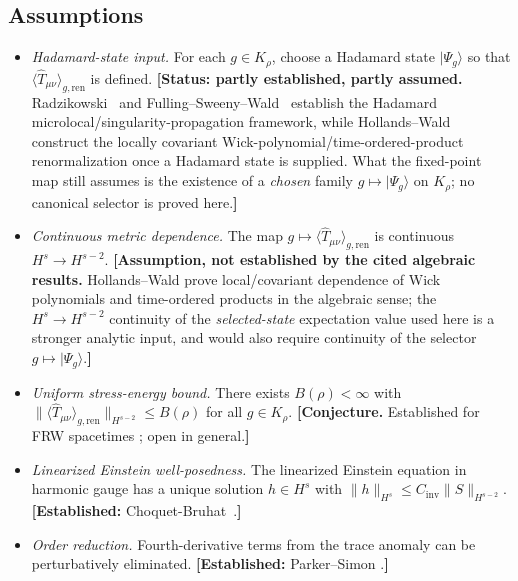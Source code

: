 \documentclass[12pt,a4paper]{article}
\begin{document}
\subsection{Assumptions}

\begin{itemize}
\item[\textbf{(A1)}] \textit{Hadamard-state input.} For each $g\in K_\rho$, choose a
Hadamard state $|\Psi_g\rangle$ so that $\langle\hat{T}_{\mu\nu}\rangle_{g,\text{ren}}$ is
defined. \textbf{[Status: partly established, partly assumed.} Radzikowski~\cite{radzikowski}
and Fulling--Sweeny--Wald~\cite{fulling_sweeny_wald} establish the Hadamard
microlocal/singularity-propagation framework, while Hollands--Wald~\cite{hollands_wald_wick}
construct the locally covariant Wick-polynomial/time-ordered-product renormalization once a
Hadamard state is supplied. What the fixed-point map still assumes is the existence of a
\emph{chosen} family $g\mapsto |\Psi_g\rangle$ on $K_\rho$; no canonical selector is proved
here.\textbf{]}

\item[\textbf{(A2)}] \textit{Continuous metric dependence.} The map $g\mapsto
\langle\hat{T}_{\mu\nu}\rangle_{g,\text{ren}}$ is continuous $H^s\to H^{s-2}$.
\textbf{[Assumption, not established by the cited algebraic results.} Hollands--Wald
\cite{hollands_wald_wick} prove local/covariant dependence of Wick polynomials and
time-ordered products in the algebraic sense; the $H^s\to H^{s-2}$ continuity of the
\emph{selected-state} expectation value used here is a stronger analytic input, and would
also require continuity of the selector $g\mapsto |\Psi_g\rangle$.\textbf{]}

\item[\textbf{(A3)}] \textit{Uniform stress-energy bound.} There exists $B(\rho)<\infty$
with $\|\langle\hat{T}_{\mu\nu}\rangle_{g,\text{ren}}\|_{H^{s-2}} \leq B(\rho)$ for all
$g\in K_\rho$. \textbf{[Conjecture.} Established for FRW spacetimes
\cite{pinamonti_siemssen}; open in general.\textbf{]}

\item[\textbf{(A4)}] \textit{Linearized Einstein well-posedness.} The linearized Einstein
equation in harmonic gauge has a unique solution $h\in H^s$ with
$\|h\|_{H^s} \leq C_{\text{inv}}\|S\|_{H^{s-2}}$.
\textbf{[Established:} Choquet-Bruhat~\cite{choquet_bruhat}.\textbf{]}

\item[\textbf{(A5)}] \textit{Order reduction.} Fourth-derivative terms from the trace
anomaly can be perturbatively eliminated. \textbf{[Established:} Parker--Simon
\cite{parker_simon}.\textbf{]}


\end{itemize}
\end{document}
